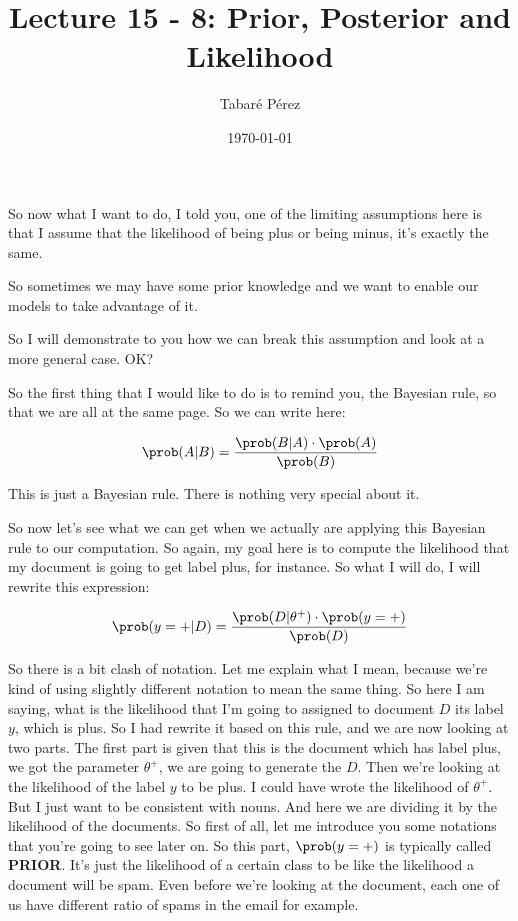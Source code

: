 \documentclass[a4paper, 12pt]{article}
\author{Tabaré Pérez}
\date{\today}
\title{Lecture 15 - 8: Prior, Posterior and Likelihood}
\begin{document}
\maketitle
So now what I want to do, I told you, one of the limiting assumptions here is
that I assume that the likelihood of being plus or being minus, it's exactly the
same.

So sometimes we may have some prior knowledge and we want to enable our models
to take advantage of it.

So I will demonstrate to you how we can break this assumption and look at a more
general case. OK?

So the first thing that I would like to do is to remind you, the Bayesian rule,
so that we are all at the same page. So we can write here:

\begin{equation}
\label{eq:orga39bb74}
\prob(A|B) = \frac{\prob(B|A) \cdot \prob(A)}{\prob(B)}
\end{equation}

This is just a Bayesian rule. There is nothing very special about it.

So now let's see what we can get when we actually are applying this Bayesian
rule to our computation. So again, my goal here is to compute the likelihood
that my document is going to get label plus, for instance. So what I will do, I
will rewrite this expression:

\begin{equation}
\label{eq:orgc2b7148}
\prob(y=+|D) = \frac{\prob(D|\theta^+) \cdot \prob(y=+)}{\prob(D)}
\end{equation}

So there is a bit clash of notation. Let me explain what I mean, because we're
kind of using slightly different notation to mean the same thing. So here I am
saying, what is the likelihood that I'm going to assigned to document \(D\) its
label \(y\), which is plus. So I had rewrite it based on this rule, and we are
now looking at two parts. The first part is given that this is the document
which has label plus, we got the parameter \(\theta^+\), we are going to
generate the \(D\). Then we're looking at the likelihood of the label \(y\) to
be plus. I could have wrote the likelihood of \(\theta^+\). But I just want to
be consistent with nouns. And here we are dividing it by the likelihood of the
documents. So first of all, let me introduce you some notations that you're
going to see later on. So this part, \(\prob(y=+)\) is typically called \textbf{PRIOR}.
It's just the likelihood of a certain class to be like the likelihood a document
will be spam. Even before we're looking at the document, each one of us have
different ratio of spams in the email for example.
\end{document}
